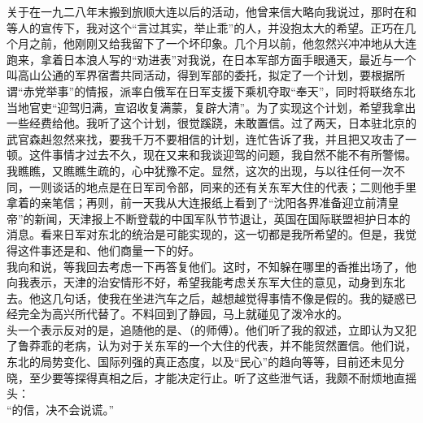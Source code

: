 关于在一九二八年末搬到旅顺大连以后的活动，他曾来信大略向我说过，那时在和等人的宣传下，我对这个“言过其实，举止乖”的人，并没抱太大的希望。正巧在几个月之前，他刚刚又给我留下了一个坏印象。几个月以前，他忽然兴冲冲地从大连跑来，拿着日本浪人写的“劝进表”对我说，在日本军部方面手眼通天，最近与一个叫高山公通的军界宿耆共同活动，得到军部的委托，拟定了一个计划，要根据所谓“赤党举事”的情报，派率白俄军在日军支援下乘机夺取“奉天”，同时将联络东北当地官吏“迎驾归满，宣诏收复满蒙，复辟大清”。为了实现这个计划，希望我拿出一些经费给他。我听了这个计划，很觉蹊跷，未敢置信。过了两天，日本驻北京的武官森赳忽然来找，要我千万不要相信的计划，连忙告诉了我，并且把又攻击了一顿。这件事情才过去不久，现在又来和我谈迎驾的问题，我自然不能不有所警惕。\\

我瞧瞧，又瞧瞧生疏的，心中犹豫不定。显然，这次的出现，与以往任何一次不同，一则谈话的地点是在日军司令部，同来的还有关东军大住的代表；二则他手里拿着的亲笔信；再则，前一天我从大连报纸上看到了“沈阳各界准备迎立前清皇帝”的新闻，天津报上不断登载的中国军队节节退让，英国在国际联盟袒护日本的消息。看来日军对东北的统治是可能实现的，这一切都是我所希望的。但是，我觉得这件事还是和、他们商量一下的好。\\

我向和说，等我回去考虑一下再答复他们。这时，不知躲在哪里的香推出场了，他向我表示，天津的治安情形不好，希望我能考虑关东军大住的意见，动身到东北去。他这几句话，使我在坐进汽车之后，越想越觉得事情不像是假的。我的疑惑已经完全为高兴所代替了。不料回到了静园，马上就碰见了泼冷水的。\\

头一个表示反对的是，追随他的是、（的师傅）。他们听了我的叙述，立即认为又犯了鲁莽乖的老病，认为对于关东军的一个大住的代表，并不能贸然置信。他们说，东北的局势变化、国际列强的真正态度，以及“民心”的趋向等等，目前还未见分晓，至少要等探得真相之后，才能决定行止。听了这些泄气话，我颇不耐烦地直摇头：\\

“的信，决不会说谎。”\\

